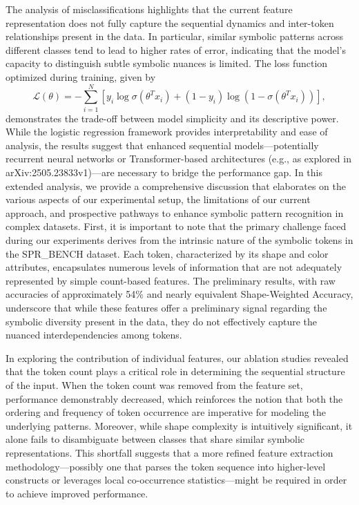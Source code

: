 \documentclass{article}
\begin{document}
The analysis of misclassifications highlights that the current feature representation does not fully capture the sequential dynamics and inter-token relationships present in the data. In particular, similar symbolic patterns across different classes tend to lead to higher rates of error, indicating that the model's capacity to distinguish subtle symbolic nuances is limited. The loss function optimized during training, given by 
\[
\mathcal{L}(\theta) = -\sum_{i=1}^{N} \left[y_i \log \sigma(\theta^T x_i) + (1-y_i) \log (1-\sigma(\theta^T x_i))\right],
\]
demonstrates the trade-off between model simplicity and its descriptive power. While the logistic regression framework provides interpretability and ease of analysis, the results suggest that enhanced sequential models—potentially recurrent neural networks or Transformer-based architectures (e.g., as explored in arXiv:2505.23833v1)—are necessary to bridge the performance gap.
In this extended analysis, we provide a comprehensive discussion that elaborates on the various aspects of our experimental setup, the limitations of our current approach, and prospective pathways to enhance symbolic pattern recognition in complex datasets. First, it is important to note that the primary challenge faced during our experiments derives from the intrinsic nature of the symbolic tokens in the SPR_BENCH dataset. Each token, characterized by its shape and color attributes, encapsulates numerous levels of information that are not adequately represented by simple count-based features. The preliminary results, with raw accuracies of approximately 54\% and nearly equivalent Shape-Weighted Accuracy, underscore that while these features offer a preliminary signal regarding the symbolic diversity present in the data, they do not effectively capture the nuanced interdependencies among tokens. 

In exploring the contribution of individual features, our ablation studies revealed that the token count plays a critical role in determining the sequential structure of the input. When the token count was removed from the feature set, performance demonstrably decreased, which reinforces the notion that both the ordering and frequency of token occurrence are imperative for modeling the underlying patterns. Moreover, while shape complexity is intuitively significant, it alone fails to disambiguate between classes that share similar symbolic representations. This shortfall suggests that a more refined feature extraction methodology—possibly one that parses the token sequence into higher-level constructs or leverages local co-occurrence statistics—might be required in order to achieve improved performance. 
\end{document}
